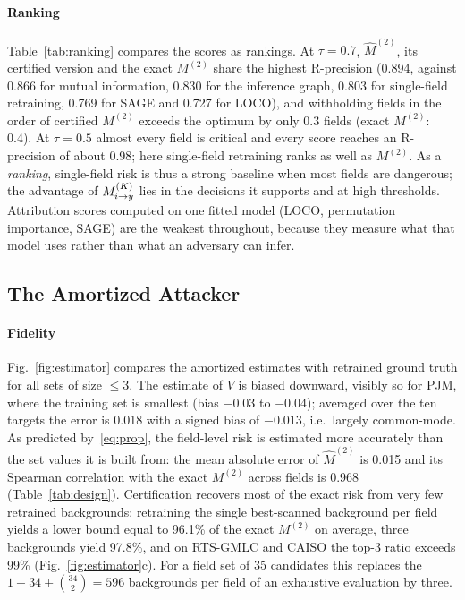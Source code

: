 \paragraph{Ranking}
Table~\ref{tab:ranking} compares the scores as rankings. At $\tau=0.7$, $\hat M^{(2)}$, its certified
version and the exact $M^{(2)}$ share the highest R-precision (0.894, against 0.866 for mutual information, 0.830 for the
inference graph, 0.803 for single-field retraining, 0.769 for SAGE and 0.727 for LOCO), and withholding fields in
the order of certified $M^{(2)}$ exceeds the optimum by only 0.3 fields (exact $M^{(2)}$: 0.4). At $\tau=0.5$
almost every field is critical and every score reaches an R-precision of about 0.98; here
single-field retraining ranks as well as $M^{(2)}$. As a \emph{ranking}, single-field risk is thus a strong
baseline when most fields are dangerous; the advantage of $M^{(K)}_{i \to y}$ lies in the decisions it supports and at high
thresholds. Attribution scores computed on one fitted
model (LOCO, permutation importance, SAGE) are the weakest throughout, because they measure what
that model uses rather than what an adversary can infer.



\subsection{The Amortized Attacker}\label{sec:res-est}

\paragraph{Fidelity}
Fig.~\ref{fig:estimator} compares the amortized estimates with retrained ground truth for all
sets of size $\le 3$. The estimate of $V$ is biased downward, visibly so for PJM, where the
training set is smallest (bias $-0.03$ to $-0.04$); averaged over the ten targets the error is 0.018 with a signed bias of
$-0.013$, i.e.\ largely common-mode. As predicted by~\eqref{eq:prop}, the field-level
risk is estimated more accurately than the set values it is built from: the mean absolute error of
$\hat M^{(2)}$ is 0.015 and its Spearman correlation with the exact $M^{(2)}$ across fields is
0.968 (Table~\ref{tab:design}). Certification recovers most of the exact risk from very few
retrained backgrounds: retraining the single best-scanned background per field yields a lower
bound equal to 96.1\% of the exact $M^{(2)}$ on average, three backgrounds yield 97.8\%, and on
RTS-GMLC and CAISO the top-3 ratio exceeds 99\% (Fig.~\ref{fig:estimator}c). For a field set of
35 candidates this replaces the $1+34+\binom{34}{2}=596$ backgrounds per field of an exhaustive
evaluation by three.

